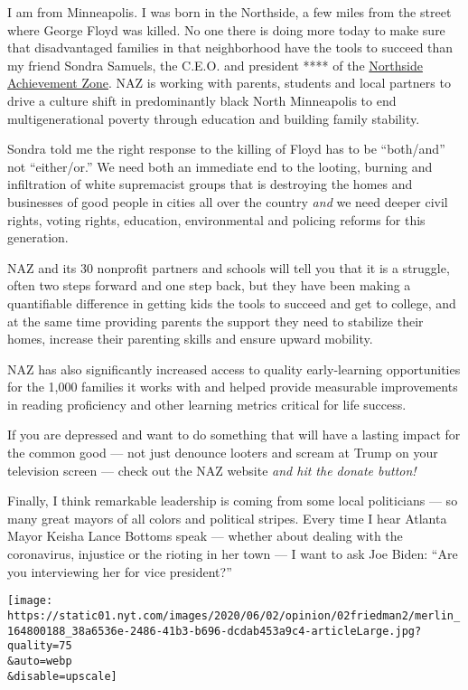 I am from Minneapolis. I was born in the Northside, a few miles from the
street where George Floyd was killed. No one there is doing more today
to make sure that disadvantaged families in that neighborhood have the
tools to succeed than my friend Sondra Samuels, the C.E.O. and president
**** of the \href{https://northsideachievement.org/}{Northside
Achievement Zone}. NAZ is working with parents, students and local
partners to drive a culture shift in predominantly black North
Minneapolis to end multigenerational poverty through education and
building family stability.

Sondra told me the right response to the killing of Floyd has to be
``both/and'' not ``either/or.'' We need both an immediate end to the
looting, burning and infiltration of white supremacist groups that is
destroying the homes and businesses of good people in cities all over
the country \emph{and} we need deeper civil rights, voting rights,
education, environmental and policing reforms for this generation.

NAZ and its 30 nonprofit partners and schools will tell you that it is a
struggle, often two steps forward and one step back, but they have been
making a quantifiable difference in getting kids the tools to succeed
and get to college, and at the same time providing parents the support
they need to stabilize their homes, increase their parenting skills and
ensure upward mobility.

NAZ has also significantly increased access to quality early-learning
opportunities for the 1,000 families it works with and helped provide
measurable improvements in reading proficiency and other learning
metrics critical for life success.

If you are depressed and want to do something that will have a lasting
impact for the common good --- not just denounce looters and scream at
Trump on your television screen --- check out the NAZ website \emph{and
hit the donate button!}

Finally, I think remarkable leadership is coming from some local
politicians --- so many great mayors of all colors and political
stripes. Every time I hear Atlanta Mayor Keisha Lance Bottoms speak ---
whether about dealing with the coronavirus, injustice or the rioting in
her town --- I want to ask Joe Biden: ``Are you interviewing her for
vice president?''

\texttt{[image: https://static01.nyt.com/images/2020/06/02/opinion/02friedman2/merlin\_164800188\_38a6536e-2486-41b3-b696-dcdab453a9c4-articleLarge.jpg?quality=75\\\&auto=webp\\\&disable=upscale]}


